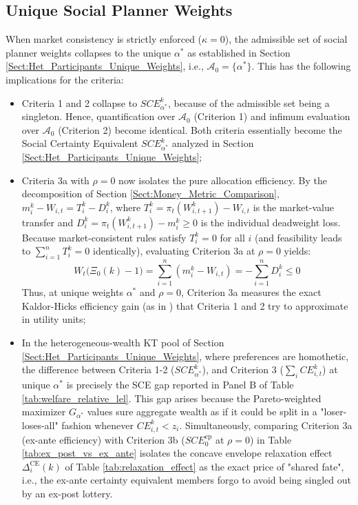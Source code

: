 \subsection{Unique Social Planner Weights}
When market consistency is strictly enforced ($\kappa=0$), the admissible set of social planner weights collapses to the unique $\alpha^*$ as established in Section \ref{Sect:Het_Participants_Unique_Weights}, i.e., $\mathcal{A}_0 = \{\alpha^*\}$. This has the following implications for the criteria:
\begin{itemize}
    \item Criteria 1 and 2 collapse to $SCE_{\alpha^*}^k$, because of the admissible set being a singleton. Hence, quantification over $\mathcal{A}_0$ (Criterion 1) and infimum evaluation over $\mathcal{A}_0$ (Criterion 2) become identical. Both criteria essentially become the Social Certainty Equivalent $SCE_{\alpha^*}^k$ analyzed in Section \ref{Sect:Het_Participants_Unique_Weights};
    \item Criteria 3a with $\rho=0$ now isolates the pure allocation efficiency. By the decomposition of Section \ref{Sect:Money_Metric_Comparison}, $m_i^k - W_{i,t} = T_i^k - D_i^k$, where $T_i^k = \pi_t(W_{i,t+1}^k) - W_{i,t}$ is the market-value transfer and $D_i^k = \pi_t(W_{i,t+1}^k) - m_i^k \ge 0$ is the individual deadweight loss. Because market-consistent rules satisfy $T_i^k = 0$ for all $i$ (and feasibility leads to $\sum_{i=1}^n T_i^k = 0$ identically), evaluating Criterion 3a at $\rho = 0$ yields:
    \begin{equation*}
        W_t \big( \Xi_0(k) - 1 \big) = \sum_{i=1}^n (m_i^k - W_{i,t}) = -\sum_{i=1}^n D_i^k \le 0
    \end{equation*}
    Thus, at unique weights $\alpha^*$ and $\rho=0$, Criterion 3a measures the exact Kaldor-Hicks efficiency gain (as in \citet{DavilaSchaab2025}) that Criteria 1 and 2 try to approximate in utility units;
    \item In the heterogeneous-wealth KT pool of Section \ref{Sect:Het_Participants_Unique_Weights}, where preferences are homothetic, the difference between Criteria 1-2 ($SCE_{\alpha^*}^k$), and Criterion 3 ($\sum_i CE_{i,t}^k$) at unique $\alpha^*$ is precisely the SCE gap reported in Panel B of Table \ref{tab:welfare_relative_lel}. This gap arises because the Pareto-weighted maximizer $G_{\alpha^*}$ values sure aggregate wealth as if it could be split in a "loser-loses-all" fashion whenever $CE_{i,t}^k < z_i$. Simultaneously, comparing Criterion 3a (ex-ante efficiency) with Criterion 3b ($SCE_0^{\text{ep}}$ at $\rho = 0$) in Table \ref{tab:ex_post_vs_ex_ante} isolates the concave envelope relaxation effect $\Delta_i^{\text{CE}}(k)$ of Table \ref{tab:relaxation_effect} as the exact price of "shared fate", i.e., the ex-ante certainty equivalent members forgo to avoid being singled out by an ex-post lottery.
\end{itemize}

